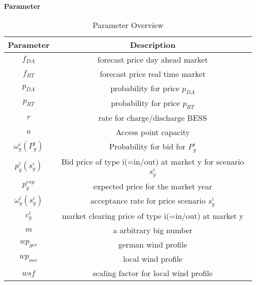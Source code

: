 \textbf{Parameter}
\begin{table}
	\centering
	\begin{tabular}{c|c}
		\textbf{Parameter}      & Description                                                   \\
		\hline
		$f_{DA}$                & forecast price day ahead market                               \\
		$f_{RT}$                & forecast price real time market                               \\

		$p_{DA}$                & probability for price $p_{DA}$                                \\
		$p_{RT}$                & probability for price $p_{RT}$                                \\


		$r$                     & rate for charge/discharge BESS                                \\
		$a$                     & Access point capacity                                         \\
		$\omega^i_{y}(P^i_{y})$ & Probability for bid for $P^i_{y}$                             \\
		$p^i_{y}(s^i_y)$        & Bid price of type i(=in/out) at market y for scenario $s^i_y$ \\
		$p^{exp}_{y}$           & expected price for the market year                            \\
		$\omega^i_{y}(s^i_y)$   & acceptance rate for price scenario $s^i_y$                    \\
		$c^i_y$                 & market clearing price of type i(=in/out) at market y          \\
		$m$                     & a arbitrary big number                                        \\
		$wp_{ger}$              & german wind profile                                           \\
		$wp_{our}$              & local wind profile                                            \\
		$wsf$                   & scaling factor for local wind profile
	\end{tabular}
	\caption{Parameter Overview}
	\label{tab:Parameter_Overview}
\end{table}





